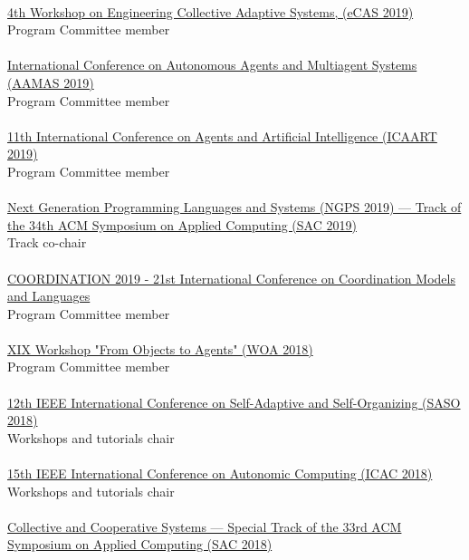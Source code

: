 \halfblankline \\
\href{http://apice.unibo.it/xwiki/bin/view/ECAS2019/Committees}{4th Workshop on Engineering Collective Adaptive Systems, (eCAS 2019)}
\\ Program Committee member \\
\halfblankline \\
\href{http://aamas2019.encs.concordia.ca/}{International Conference on Autonomous Agents and 
Multiagent Systems (AAMAS 2019)}
\\ Program Committee member \\
\halfblankline \\
\href{http://www.icaart.org/}{11th International Conference on Agents and Artificial Intelligence 
(ICAART 2019)}
\\ Program Committee member \\
\halfblankline \\
\href{https://ngps2019.github.io/}{Next Generation Programming Languages and Systems (NGPS 2019) --- 
Track of the 34th ACM Symposium on Applied Computing (SAC 2019)}
\\ Track co-chair \\
\halfblankline \\
\href{http://www.discotec.org/2019/coordination}{COORDINATION 2019 - 21st International Conference on Coordination Models and Languages}
\\ Program Committee member \\
\halfblankline \\
\href{http://diid.unipa.it/roboticslab/woa2018/}{XIX Workshop "From Objects to Agents" (WOA 2018)}
\\ Program Committee member \\
\halfblankline \\
\href{https://saso2018.fbk.eu/}{12th IEEE International Conference on Self-Adaptive and Self-Organizing (SASO 2018)}
\\ Workshops and tutorials chair \\
\halfblankline \\
\href{http://icac2018.informatik.uni-wuerzburg.de/committees/organization-committee/}{15th IEEE International Conference on Autonomic Computing (ICAC 2018)}
\\ Workshops and tutorials chair \\
\halfblankline \\
\href{http://sac-cas2018.apice.unibo.it/referees.html}{Collective and Cooperative Systems --- Special Track of the 33rd ACM Symposium on Applied Computing (SAC 2018)}
